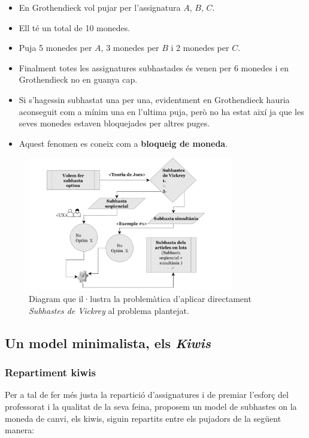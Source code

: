 \documentclass[10pt,twocolumn]{article}
\begin{document}
\begin{tcolorbox}[colback=black!1,title=\textbf{Exemple \# 1},coltitle=black,colbacktitle=black!10]
\begin{itemize}
	\item En Grothendieck vol pujar per l'assignatura $A$, $B$, $C$.
	\item Ell té un total de 10 monedes.
	\item Puja 5 monedes per $A$, 3 monedes per $B$ i 2 monedes per $C$.
	\item Finalment totes les assignatures subhastades és venen per 6 monedes i en Grothendieck no en guanya cap.
	\item Si s'hagessin subhastat una per una, evidentment en Grothendieck hauria aconseguit com a mínim una en l'ultima puja, però no ha estat així  ja que les seves monedes estaven bloquejades per altres puges. \item Aquest fenomen es coneix com a \textbf{bloqueig de moneda}.
\end{itemize}
\end{tcolorbox}
\begin{figure}[!]
	\centering
	\includegraphics[width=9cm]{subs}
	\caption{ \footnotesize Diagram que il·lustra la problemàtica d'aplicar directament \textit{Subhastes de Vickrey} al problema plantejat.}
	\label{fig:4}
\end{figure}
\subsection{Un model minimalista, els \textit{Kiwis}}
\subsubsection{Repartiment kiwis}
Per a tal de fer més justa la repartició d'assignatures i de premiar l'esforç del professorat i la qualitat de la seva feina, proposem un model de subhastes on la moneda de canvi, els kiwis, siguin repartits entre els pujadors de la següent manera:
\end{document}

